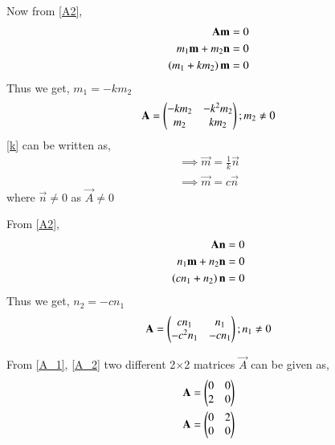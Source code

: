 \documentclass[journal,12pt,twocolumn]{IEEEtran}
\begin{document}
Now from \eqref{A2},
\begin{align}
    \mathbf{A}\mathbf{m} &= 0 \\
    m_1\mathbf{m} + m_2\mathbf{n} &= 0 \\
    \left(m_1+km_2\right)\mathbf{m} &= 0
\end{align}
Thus we get, $m_1=-km_2$
\begin{align}
    \mathbf{A} = \begin{pmatrix}-km_2 & -k^2m_2 \\ m_2 & km_2\end{pmatrix} ; m_2\ne0 \label{A_1}
\end{align}
\eqref{k} can be written as, 
\begin{align}
    \implies\vec{m}=\frac{1}{k}\vec{n} \\
    \implies\vec{m} = c\vec{n}
\end{align}
where $\vec{n}\ne0$ as $\vec{A}\ne0$

From \eqref{A2}, 
\begin{align}
    \mathbf{A}\mathbf{n} &=0 \\
    n_1\mathbf{m}+n_2\mathbf{n} &=0 \\
    \left(cn_1+n_2\right)\mathbf{n} &=0
\end{align}
Thus we get, $n_2=-cn_1$
\begin{align}
    \mathbf{A} = \begin{pmatrix}cn_1 & n_1 \\ -c^2n_1 & -cn_1\end{pmatrix} ; n_1\ne0 \label{A_2}
\end{align}

From \eqref{A_1}, \eqref{A_2} two different 2$\times$2 matrices $\vec{A}$ can be given as,
\begin{align}
    \mathbf{A} &= \begin{pmatrix}0&0\\2&0\end{pmatrix} \\
    \mathbf{A} &= \begin{pmatrix}0&2 \\0&0\end{pmatrix}
\end{align}
\end{document}
